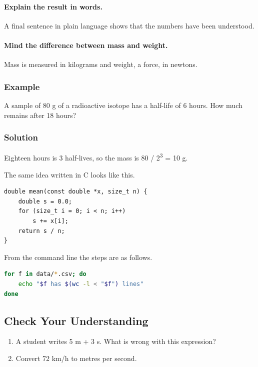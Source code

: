 \documentclass[11pt]{article}
\begin{document}
\paragraph{Explain the result in words.} A final sentence in plain language shows that the numbers have been understood.

\paragraph{Mind the difference between mass and weight.} Mass is measured in kilograms and weight, a force, in newtons.

\subsubsection*{Example}

A sample of 80 g of a radioactive isotope has a half-life of 6 hours. How much remains after 18 hours?

\subsubsection*{Solution}

Eighteen hours is 3 half-lives, so the mass is 80 / 2\textsuperscript{3} = 10 g.

The same idea written in C looks like this.

{\small\begin{verbatim}
double mean(const double *x, size_t n) {
    double s = 0.0;
    for (size_t i = 0; i < n; i++)
        s += x[i];
    return s / n;
}
\end{verbatim}}

From the command line the steps are as follows.

\begin{lstlisting}[language=bash]
for f in data/*.csv; do
    echo "$f has $(wc -l < "$f") lines"
done
\end{lstlisting}

\subsection*{Check Your Understanding}
\begin{enumerate}
\item A student writes 5 m + 3 s. What is wrong with this expression?
\item Convert 72 km/h to metres per second.
\end{enumerate}
\end{document}
